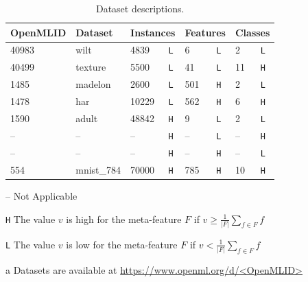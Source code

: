 \begin{table}[t]
    \caption{Dataset descriptions.}
    \footnotesize
    \label{tab:meta_features}
    \begin{threeparttable}
    \centering
        \begin{tabular}{ll|ll|ll|ll}
            \toprule
             \textbf{OpenMLID} \tnote{a} & \textbf{Dataset} & \multicolumn{2}{c}{\textbf{Instances}} & \multicolumn{2}{c}{\textbf{Features}} & \multicolumn{2}{c}{\textbf{Classes}}  \\ \midrule
             40983 & wilt & 4839 & \footnotesize{\texttt{L}} & 6 & \footnotesize{\texttt{L}} & 2 & \footnotesize{\texttt{L}}\\
             40499 & texture & 5500& \footnotesize{\texttt{L}} & 41& \footnotesize{\texttt{L}} & 11& \footnotesize{\texttt{H}}\\
             1485 & madelon & 2600 & \footnotesize{\texttt{L}} & 501 & \footnotesize{\texttt{H}} & 2 & \footnotesize{\texttt{L}}\\
             1478 & har & 10229 & \footnotesize{\texttt{L}} & 562& \footnotesize{\texttt{H}} & 6& \footnotesize{\texttt{H}}\\
             1590 & adult & 48842& \footnotesize{\texttt{H}} & 9& \footnotesize{\texttt{L}} & 2& \footnotesize{\texttt{L}}\\
             -- & -- & -- & \footnotesize{\texttt{H}} & -- & \footnotesize{\texttt{L}} & -- & \footnotesize{\texttt{H}}\\%
             -- & -- & -- & \footnotesize{\texttt{H}} & -- & \footnotesize{\texttt{H}} & -- & \footnotesize{\texttt{L}}\\%
             554 & mnist\_784 & 70000& \footnotesize{\texttt{H}} & 785& \footnotesize{\texttt{H}} & 10& \footnotesize{\texttt{H}}\\%
             \bottomrule
        \end{tabular}
        \label{tab:datasets}
        \begin{tablenotes}
            \item[--] {\scriptsize Not Applicable}
            \item[\texttt{H}] {\scriptsize The value $v$ is high for the meta-feature $F$ if $ v \geq \frac{1}{|F|}\sum_{f \in F} f$}
            \item[\texttt{L}] {\scriptsize The value $v$ is low for the meta-feature $F$ if $v < \frac{1}{|F|}\sum_{f \in F} f$}
            \item[a] {\scriptsize Datasets are available at \url{https://www.openml.org/d/<OpenMLID>}}
        \end{tablenotes}
    \end{threeparttable}
\end{table}

